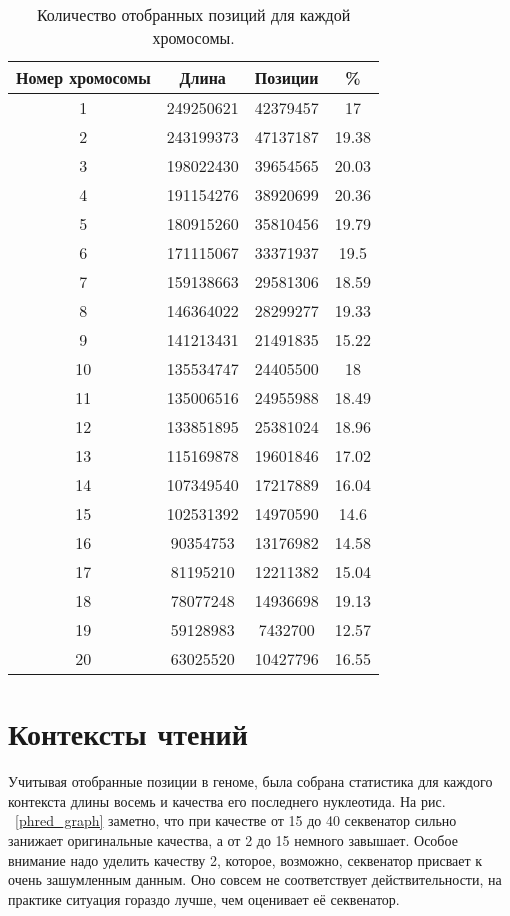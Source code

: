 \begin{table}[H]
\large
\begin{center}
\begin{tabular}{|c|c|c|c|}
\hline
Номер хромосомы & Длина & Позиции & \% \\
\hline
1 & 249250621 &  42379457 & 17\\
\hline
2 & 243199373 &  47137187  & 19.38\\
\hline
3 & 198022430 &  39654565  & 20.03\\
\hline
4 & 191154276 &  38920699  & 20.36\\
\hline
5 & 180915260 &  35810456  & 19.79\\
\hline
6 & 171115067 &  33371937  & 19.5\\
\hline
7 & 159138663 &  29581306  & 18.59\\
\hline
8 & 146364022 &  28299277  & 19.33\\
\hline
9 & 141213431 &  21491835  & 15.22\\
\hline
10 & 135534747 &  24405500  & 18\\
\hline
11 & 135006516 &  24955988  & 18.49\\
\hline
12 & 133851895 &  25381024  & 18.96\\
\hline
13 & 115169878 &  19601846 & 17.02\\
\hline
14 & 107349540 &  17217889  & 16.04\\
\hline
15 & 102531392 &  14970590  & 14.6\\
\hline
16 & 90354753 &  13176982  & 14.58\\
\hline
17 & 81195210 &  12211382  & 15.04\\
\hline
18 & 78077248 &  14936698  & 19.13\\
\hline
19 & 59128983 &  7432700 & 12.57\\
\hline
20 & 63025520 &  10427796  & 16.55\\
\hline
\end{tabular}
\label{cont} 
\end{center}
\captionsetup{justification=centering}
\caption{Количество отобранных позиций для каждой хромосомы.}
\end{table} 

\section{Контексты чтений}

Учитывая отобранные позиции в геноме, была собрана статистика для каждого контекста длины восемь и качества его последнего нуклеотида. На рис. ~\ref{phred_graph} заметно, что при качестве от 15 до 40 секвенатор сильно занижает оригинальные качества, а от 2 до 15 немного завышает. Особое внимание надо уделить качеству 2, которое, возможно, секвенатор присвает к очень зашумленным данным. Оно совсем не соответствует действительности, на практике ситуация гораздо лучше, чем оценивает её секвенатор. 

